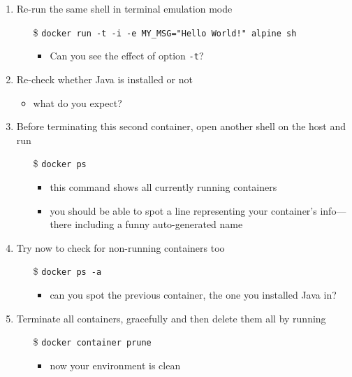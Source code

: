 \documentclass[handout]{beamer}\mode<presentation>{\usetheme{AMSCesenaBleu}}
\begin{document}
\begin{frame}[allowframebreaks]
\begin{enumerate}
        \item Re-run the same shell in terminal emulation mode
        \begin{itemize}
            \item[\$] \texttt{docker run \alert{-t} -i -e MY\_MSG="Hello World!" alpine sh}
            \begin{itemize}
                \item Can you see the effect of option \texttt{-t}?
            \end{itemize}
        \end{itemize}
        
        \item Re-check whether Java is installed or not
        \begin{itemize}
            \item what do you expect?
        \end{itemize}
        
        \framebreak
        
        \item \alert{Before terminating this second container}, open another shell \alert{on the host} and run
        \begin{itemize}
            \item[\$] \texttt{docker \alert{ps}}
            \begin{itemize}
                \item this command shows all \alert{currently} running containers
                \item you should be able to spot a line representing your container's info---there including a funny auto-generated name
            \end{itemize}
        \end{itemize}
        
        \item Try now to check for non-running containers too
        \begin{itemize}
            \item[\$] \texttt{docker ps \alert{-a}}
            \begin{itemize}
                \item can you spot the previous container, the one you installed Java in?
            \end{itemize}
        \end{itemize}
        
        \item Terminate all containers, gracefully and then delete them all by running
        \begin{itemize}
            \item[\$] \texttt{docker container \alert{prune}}
            \begin{itemize}
                \item now your environment is clean
            \end{itemize}
        \end{itemize}
        

\end{enumerate}
\end{frame}
\end{document}
